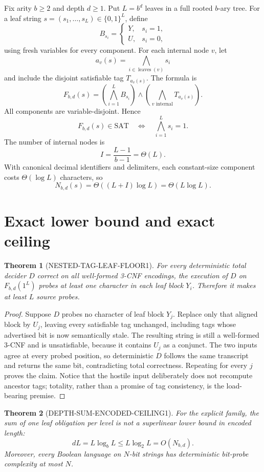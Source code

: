 \documentclass[11pt]{article}
\newtheorem{theorem}{Theorem}
\begin{document}
Fix arity $b\ge 2$ and depth $d\ge 1$.  Put $L=b^d$ leaves in a full rooted $b$-ary tree.  For a leaf string $s=(s_1,\ldots,s_L)\in\{0,1\}^L$, define
\[
  B_{s_i}=\begin{cases}Y,&s_i=1,\\U,&s_i=0,\end{cases}
\]
using fresh variables for every component.  For each internal node $v$, let
\[
  a_v(s)=\bigwedge_{i\in\operatorname{leaves}(v)}s_i
\]
and include the disjoint satisfiable tag $T_{a_v(s)}$.  The formula is
\[
  F_{b,d}(s)=\left(\bigwedge_{i=1}^{L}B_{s_i}\right)
  \wedge\left(\bigwedge_{v\text{ internal}}T_{a_v(s)}\right).
\]
All components are variable-disjoint.  Hence
\[
  F_{b,d}(s)\in\mathrm{SAT}\quad\Longleftrightarrow\quad
  \bigwedge_{i=1}^{L}s_i=1.
\]
The number of internal nodes is
\[
  I=\frac{L-1}{b-1}=\Theta(L).
\]
With canonical decimal identifiers and delimiters, each constant-size component costs $\Theta(\log L)$ characters, so
\[
  N_{b,d}(s)=\Theta((L+I)\log L)=\Theta(L\log L).
\]

\section{Exact lower bound and exact ceiling}

\begin{theorem}[NESTED-TAG-LEAF-FLOOR1]
For every deterministic total decider $D$ correct on all well-formed 3-CNF encodings, the execution of $D$ on $F_{b,d}(1^L)$ probes at least one character in each leaf block $Y_i$.  Therefore it makes at least $L$ source probes.
\end{theorem}

\begin{proof}
Suppose $D$ probes no character of leaf block $Y_j$.  Replace only that aligned block by $U_j$, leaving every satisfiable tag unchanged, including tags whose advertised bit is now semantically stale.  The resulting string is still a well-formed 3-CNF and is unsatisfiable, because it contains $U_j$ as a conjunct.  The two inputs agree at every probed position, so deterministic $D$ follows the same transcript and returns the same bit, contradicting total correctness.  Repeating for every $j$ proves the claim.  Notice that the hostile input deliberately does not recompute ancestor tags; totality, rather than a promise of tag consistency, is the load-bearing premise.
\end{proof}

\begin{theorem}[DEPTH-SUM-ENCODED-CEILING1]
For the explicit family, the sum of one leaf obligation per level is not a superlinear lower bound in encoded length:
\[
  dL=L\log_b L\le L\log_2 L=O(N_{b,d}).
\]
Moreover, every Boolean language on $N$-bit strings has deterministic bit-probe complexity at most $N$.
\end{theorem}
\end{document}
